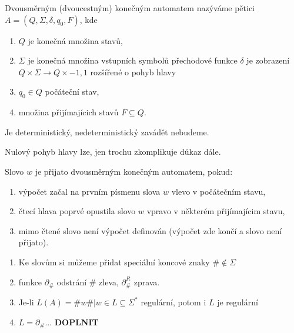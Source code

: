 \documentclass[../main.tex]{subfiles}
\begin{document}
\begin{definition}
    Dvousměrným (dvoucestným) konečným automatem nazýváme pětici $A = (Q,\Sigma, \delta, q_0,F)$, kde
    \begin{enumerate}
        \item $Q$ je konečná množina stavů,
        \item $\Sigma$ je konečná množina vstupních symbolů přechodové funkce $\delta$ je zobrazení $Q \times \Sigma \rightarrow Q \times {-1,1}$ rozšířené o pohyb hlavy
        \item $q_0 \in Q$ počáteční stav,
        \item množina přijímajícich stavů $F \subseteq Q$.
    \end{enumerate}
\end{definition}
\begin{remark}
    Je deterministický, nedeterministický zavádět nebudeme.
\end{remark}
\begin{remark}
    Nulový pohyb hlavy lze, jen trochu zkomplikuje důkaz dále.
\end{remark}

\begin{definition}
    Slovo $w$ je přijato dvousměrným konečným automatem, pokud:
    \begin{enumerate}
        \item výpočet začal na prvním písmenu slova $w$ vlevo v počátečním stavu,
        \item čtecí hlava poprvé opustila slovo $w$ vpravo v některém přijímajícim stavu,
        \item mimo čtené slovo není výpočet definován (výpočet zde končí a slovo není přijato).
    \end{enumerate}
    \begin{remark}
        \begin{enumerate}
            \item Ke slovům si můžeme přidat speciální koncové znaky $\# \notin \Sigma$
            \item funkce $\partial_{\#}$ odstrání $\#$ zleva, $\partial^R_{\#}$ zprava.
            \item Je-li $L(A) = {\#w\#|w\in L \subseteq \Sigma^*}$ regulární, potom i $L$ je regulární
            \item $L = \partial_{\#}$... \textbf{DOPLNIT}
        \end{enumerate}
    \end{remark}
\end{definition}
\end{document}
